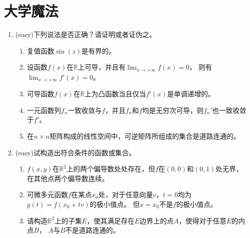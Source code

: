 \documentclass[a4paper]{article}
\begin{document}
\section{大学魔法}
\begin{enumerate}
\item (easy)下列说法是否正确？请证明或者证伪之。
	\begin{enumerate}
	\item 复值函数$\sin(z)$是有界的。
	\item 设函数$f(x)$在$\mathbb{R}$上可导，并且有$\lim_{x\rightarrow +\infty}f(x)=0$，
	则有$\lim_{x\rightarrow +\infty}f'(x)=0$。
	\item 可导函数$f(x)$在$\mathbb{R}$上为凸函数当且仅当$f'(x)$是单调递增的。
	\item 一元函数列$f_n$一致收敛与$f$，并且$f_n$和$f$均是无穷次可导，则$f_n'$也一致收敛于$f'$。
	\item 在$n\times n$矩阵构成的线性空间中，可逆矩阵所组成的集合是道路连通的。
	\end{enumerate}
\item (easy)试构造出符合条件的函数或集合。
	\begin{enumerate}
	\item $f(x,y)$在$\mathbb{R}^2$上的两个偏导数处处存在，但$f$在$(0,0)$和$(0,1)$处无界，
	在其他点两个偏导数连续。
	\item 可微多元函数$f$在某点$x_0$处，对于任意向量$v$，$t=0$均为$g(t)=f(x_0+tv)$的极小值点。
	但$x=x_0$不是$f$的极小值点。
	\item 请构造$\mathbb{R}^2$上的子集$E$，使其满足存在$E$边界上的点$A$，使得对于任意$E$的内点$B$，
	$A$与$B$不是道路连通的。
	\end{enumerate}


\end{enumerate}
\end{document}
